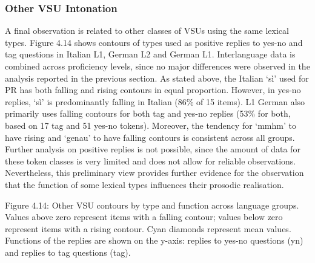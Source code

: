 \subsubsection{Other VSU Intonation}
\hypertarget{Toc191305958}{}\begin{styleStandard}
A final observation is related to other classes of VSUs using the same lexical types. Figure 4.14 shows contours of types used as positive replies to yes-no and tag questions in Italian L1, German L2 and German L1. Interlanguage data is combined across proficiency levels, since no major differences were observed in the analysis reported in the previous section. As stated above, the Italian ‘sì’ used for PR has both falling and rising contours in equal proportion. However, in yes-no replies, ‘sì’ is predominantly falling in Italian (86\% of 15 items). L1 German also primarily uses falling contours for both tag and yes-no replies (53\% for both, based on 17 tag and 51 yes-no tokens). Moreover, the tendency for ‘mmhm’ to have rising and ‘genau’ to have falling contours is consistent across all groups. Further analysis on positive replies is not possible, since the amount of data for these token classes is very limited and does not allow for reliable observations. Nevertheless, this preliminary view provides further evidence for the observation that the function of some lexical types influences their prosodic realisation.
\end{styleStandard}

\begin{stylecaption}
  [Warning: Image ignored] %
 
\end{stylecaption}

\begin{stylecaption}
Figure 4.14: Other VSU contours by type and function across language groups. Values above zero represent items with a falling contour; values below zero represent items with a rising contour. Cyan diamonds represent mean values. Functions of the replies are shown on the y-axis: replies to yes-no questions (yn) and replies to tag questions (tag).
\end{stylecaption}

